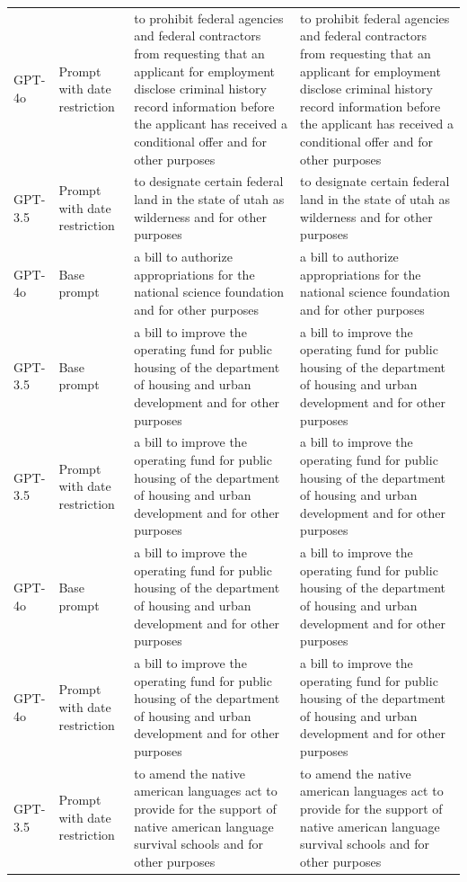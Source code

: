 \begin{longtable}{>{\raggedright\arraybackslash}p{1.4cm}>{\raggedright\arraybackslash}p{1.4cm}>{\raggedright\arraybackslash}p{5.5cm}>{\raggedright\arraybackslash}p{5.5cm}}
GPT-4o & Prompt with date restriction & to prohibit federal agencies and federal contractors from requesting that an applicant for employment disclose criminal history record information before the applicant has received a conditional offer and for other purposes & to prohibit federal agencies and federal contractors from requesting that an applicant for employment disclose criminal history record information before the applicant has received a conditional offer and for other purposes\\
GPT-3.5 & Prompt with date restriction & to designate certain federal land in the state of utah as wilderness and for other purposes & to designate certain federal land in the state of utah as wilderness and for other purposes\\
GPT-4o & Base prompt & a bill to authorize appropriations for the national science foundation and for other purposes & a bill to authorize appropriations for the national science foundation and for other purposes\\
GPT-3.5 & Base prompt & a bill to improve the operating fund for public housing of the department of housing and urban development and for other purposes & a bill to improve the operating fund for public housing of the department of housing and urban development and for other purposes\\
GPT-3.5 & Prompt with date restriction & a bill to improve the operating fund for public housing of the department of housing and urban development and for other purposes & a bill to improve the operating fund for public housing of the department of housing and urban development and for other purposes\\
GPT-4o & Base prompt & a bill to improve the operating fund for public housing of the department of housing and urban development and for other purposes & a bill to improve the operating fund for public housing of the department of housing and urban development and for other purposes\\
GPT-4o & Prompt with date restriction & a bill to improve the operating fund for public housing of the department of housing and urban development and for other purposes & a bill to improve the operating fund for public housing of the department of housing and urban development and for other purposes\\
GPT-3.5 & Prompt with date restriction & to amend the native american languages act to provide for the support of native american language survival schools and for other purposes & to amend the native american languages act to provide for the support of native american language survival schools and for other purposes\\

\end{longtable}
